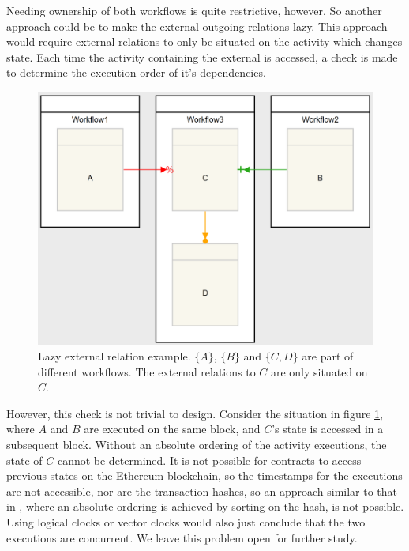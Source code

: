 \documentclass{article}
\begin{document}
			Needing ownership of both workflows is quite restrictive, however.
			So another approach could be to make the external outgoing relations lazy. 
			This approach would require external relations to only be situated on the activity which changes state.
			Each time the activity containing the external is accessed, a check is made to determine the execution order of it's dependencies. 

			\begin{figure}[!ht]
				\centering
				\includegraphics[scale=0.4]{figures/lazy-external-relation-example.PNG}
			 	\caption[Lazy external relation example]
			 	{Lazy external relation example. $\{A\}$, $\{B\}$ and $\{C, D\}$ are part of different workflows. The external relations to $C$ are only situated on $C$.}
			 	\label{fig:lazy-external-relations-example}
			\end{figure}

			However, this check is not trivial to design.
			Consider the situation in figure \ref{fig:lazy-external-relations-example}, where $A$ and $B$ are executed on the same block, and $C$'s state is accessed in a subsequent block.
			Without an absolute ordering of the activity executions, the state of $C$ cannot be determined. 
			It is not possible for contracts to access previous states on the Ethereum blockchain, so the timestamps for the executions are not accessible, nor are the transaction hashes, so an approach similar to that in \cite{bachelor}, where an absolute ordering is achieved by sorting on the hash, is not possible.
			Using logical clocks or vector clocks would also just conclude that the two executions are concurrent.
			We leave this problem open for further study.
\end{document}
